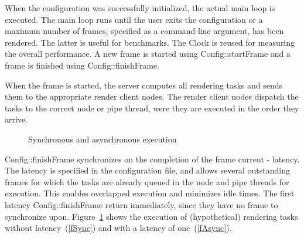 \documentclass[10pt,a4]{scrartcl}
\begin{document}
When the configuration was successfully initialized, the actual main
loop is executed. The main loop runs until the user exits the
configuration or a maximum number of frames, specified as a command-line
argument, has been rendered. The latter is useful for benchmarks. The
\textsf{Clock} is reused for measuring the overall performance. A new
frame is started using \textsf{Config::startFrame} and a frame is
finished using \textsf{Config::finishFrame}.

When the frame is started, the server computes all rendering tasks and
sends them to the appropriate render client nodes. The render client
nodes dispatch the tasks to the correct node or pipe thread, were they
are executed in the order they arrive.

\begin{figure}
  \hfil
  {\caption{\small\label{fSyncAsync}Synchronous and asynchronous execution}}
\end{figure}
\textsf{Config::finishFrame} synchronizes on the completion of the frame
\textsf{current - latency}. The latency is specified in the
configuration file, and allows several outstanding frames for which the
tasks are already queued in the node and pipe threads for
execution. This enables overlapped execution and minimizes idle
times. The first \textsf{latency Config::finishFrame} return
immediately, since they have no frame to synchronize
upon. Figure~\ref{fSyncAsync} shows the execution of (hypothetical)
rendering tasks without latency~(\ref{fSync}) and with a latency of
one~(\ref{fAsync}).
\end{document}
